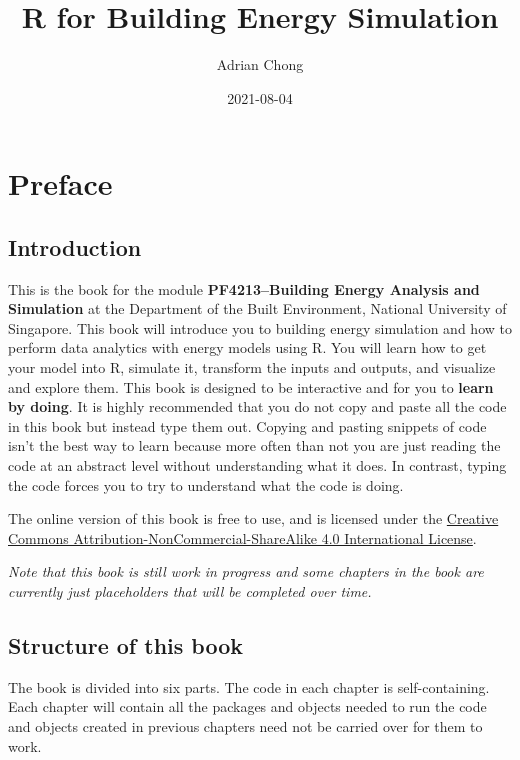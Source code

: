 \documentclass[
]{book}
\title{R for Building Energy Simulation}
\author{Adrian Chong}
\date{2021-08-04}
\begin{document}
\maketitle

{
\setcounter{tocdepth}{1}
\tableofcontents
}
\hypertarget{preface}{%
\chapter*{Preface}\label{preface}}

\hypertarget{introduction}{%
\section*{Introduction}\label{introduction}}

This is the book for the module \textbf{PF4213--Building Energy Analysis and Simulation} at the Department of the Built Environment, National University of Singapore. This book will introduce you to building energy simulation and how to perform data analytics with energy models using R. You will learn how to get your model into R, simulate it, transform the inputs and outputs, and visualize and explore them. This book is designed to be interactive and for you to \textbf{learn by doing}. It is highly recommended that you do not copy and paste all the code in this book but instead type them out. Copying and pasting snippets of code isn't the best way to learn because more often than not you are just reading the code at an abstract level without understanding what it does. In contrast, typing the code forces you to try to understand what the code is doing.

The online version of this book is free to use, and is licensed under the \href{https://creativecommons.org/licenses/by-nc-sa/4.0/}{Creative Commons Attribution-NonCommercial-ShareAlike 4.0 International License}.

\emph{Note that this book is still work in progress and some chapters in the book are currently just placeholders that will be completed over time.}

\hypertarget{structure-of-this-book}{%
\section*{Structure of this book}\label{structure-of-this-book}}

The book is divided into six parts. The code in each chapter is self-containing. Each chapter will contain all the packages and objects needed to run the code and objects created in previous chapters need not be carried over for them to work.
\end{document}
